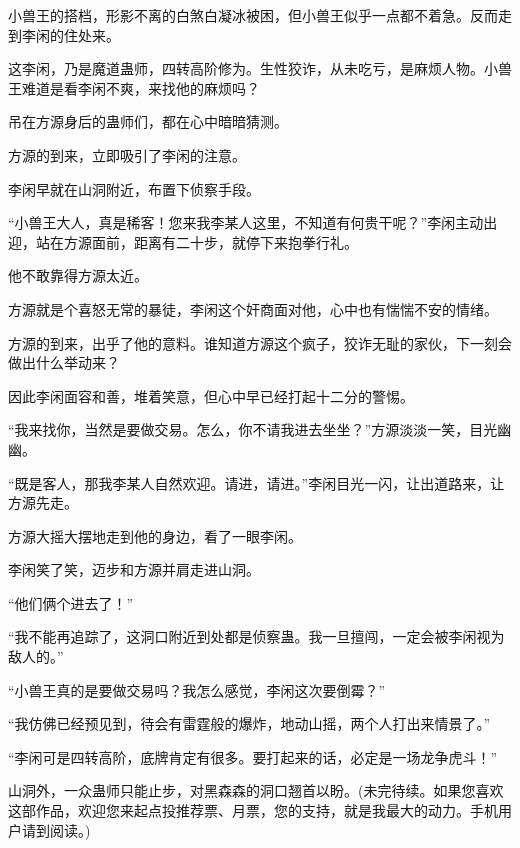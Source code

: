 \begin{this_body}
小兽王的搭档，形影不离的白煞白凝冰被困，但小兽王似乎一点都不着急。反而走到李闲的住处来。

这李闲，乃是魔道蛊师，四转高阶修为。生性狡诈，从未吃亏，是麻烦人物。小兽王难道是看李闲不爽，来找他的麻烦吗？

吊在方源身后的蛊师们，都在心中暗暗猜测。

方源的到来，立即吸引了李闲的注意。

李闲早就在山洞附近，布置下侦察手段。

“小兽王大人，真是稀客！您来我李某人这里，不知道有何贵干呢？”李闲主动出迎，站在方源面前，距离有二十步，就停下来抱拳行礼。

他不敢靠得方源太近。

方源就是个喜怒无常的暴徒，李闲这个奸商面对他，心中也有惴惴不安的情绪。

方源的到来，出乎了他的意料。谁知道方源这个疯子，狡诈无耻的家伙，下一刻会做出什么举动来？

因此李闲面容和善，堆着笑意，但心中早已经打起十二分的警惕。

“我来找你，当然是要做交易。怎么，你不请我进去坐坐？”方源淡淡一笑，目光幽幽。

“既是客人，那我李某人自然欢迎。请进，请进。”李闲目光一闪，让出道路来，让方源先走。

方源大摇大摆地走到他的身边，看了一眼李闲。

李闲笑了笑，迈步和方源并肩走进山洞。

“他们俩个进去了！”

“我不能再追踪了，这洞口附近到处都是侦察蛊。我一旦擅闯，一定会被李闲视为敌人的。”

“小兽王真的是要做交易吗？我怎么感觉，李闲这次要倒霉？”

“我仿佛已经预见到，待会有雷霆般的爆炸，地动山摇，两个人打出来情景了。”

“李闲可是四转高阶，底牌肯定有很多。要打起来的话，必定是一场龙争虎斗！”

山洞外，一众蛊师只能止步，对黑森森的洞口翘首以盼。(未完待续。如果您喜欢这部作品，欢迎您来起点投推荐票、月票，您的支持，就是我最大的动力。手机用户请到阅读。)

\end{this_body}

